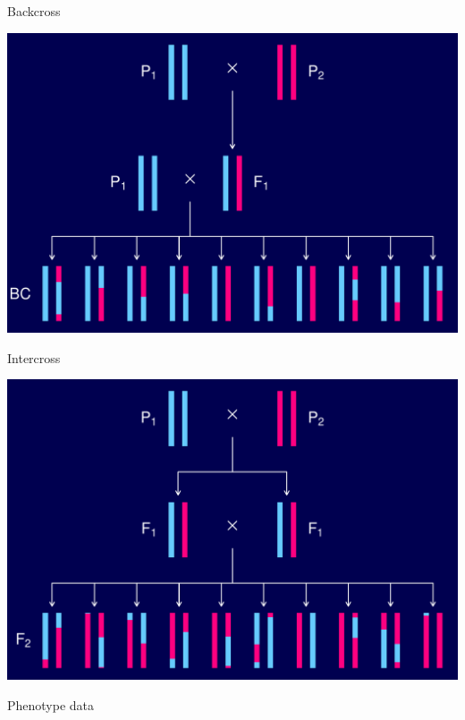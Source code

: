 \documentclass[12pt]{article}
\newcommand{\headsize}{\fontsize{35}{35} \selectfont}
\begin{document}
\newpage

\headsize \color{myyellow}
\hfill \begin{minipage}{5.75in}
\centering
Backcross
\end{minipage}

\vfill

\centerline{\includegraphics{FigsA/backcross.pdf}}

\newpage

\headsize \color{myyellow}
\hfill \begin{minipage}{5.75in}
\centering
Intercross
\end{minipage}

\vfill

\centerline{\includegraphics{FigsA/intercross.pdf}}

\newpage

\headsize \color{myyellow}
\hfill \begin{minipage}{5.75in}
\centering
Phenotype data
\end{minipage}
\end{document}
